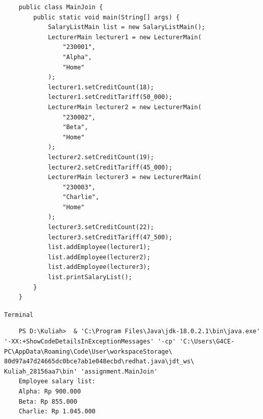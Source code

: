 \documentclass[12pt,titlepage]{article}
\begin{document}
\begin{verbatim}
    public class MainJoin {
        public static void main(String[] args) {
            SalaryListMain list = new SalaryListMain();
            LecturerMain lecturer1 = new LecturerMain(
                "230001",
                "Alpha",
                "Home"
            );
            lecturer1.setCreditCount(18);
            lecturer1.setCreditTariff(50_000);
            LecturerMain lecturer2 = new LecturerMain(
                "230002",
                "Beta",
                "Home"
            );
            lecturer2.setCreditCount(19);
            lecturer2.setCreditTariff(45_000);
            LecturerMain lecturer3 = new LecturerMain(
                "230003",
                "Charlie",
                "Home"
            );
            lecturer3.setCreditCount(22);
            lecturer3.setCreditTariff(47_500);
            list.addEmployee(lecturer1);
            list.addEmployee(lecturer2);
            list.addEmployee(lecturer3);
            list.printSalaryList();
        }
    }
\end{verbatim}
\texttt{Terminal}
\begin{verbatim}
    PS D:\Kuliah>  & 'C:\Program Files\Java\jdk-18.0.2.1\bin\java.exe' '-XX:+ShowCodeDetailsInExceptionMessages' '-cp' 'C:\Users\G4CE-PC\AppData\Roaming\Code\User\workspaceStorage\ 80d97a47d24665dc0bce7ab1e048ecbd\redhat.java\jdt_ws\ Kuliah_28156aa7\bin' 'assignment.MainJoin'
    Employee salary list:
    Alpha: Rp 900.000    
    Beta: Rp 855.000     
    Charlie: Rp 1.045.000
\end{verbatim}
\end{document}
